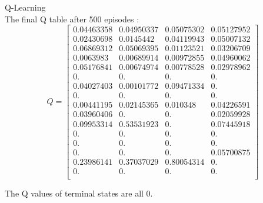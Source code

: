 \documentclass[12pt]{article}
\newenvironment{problem}[2][\large Problem]{\begin{trivlist}
\item[\hskip \labelsep {\bfseries #1}\hskip \labelsep {\bfseries #2.}]}{\end{trivlist}}
\begin{document}
\newpage
\begin{problem} {6} Q-Learning\\

The final Q table after 500 episodes :
$$ Q = \begin{bmatrix} 
 0.04463358 &  0.04950337 & 0.05075302 & 0.05127952\\
 0.02430698 & 0.0145442   & 0.04119943 & 0.05007132\\
 0.06869312 & 0.05069395  & 0.01123521 & 0.03206709\\
 0.0063983  & 0.00689914  & 0.00972855 & 0.04960062\\
 0.05176841 & 0.00674974  & 0.00778528 & 0.02978962\\
 0.         & 0.          & 0.         & 0.        \\
 0.04027403 & 0.00101772  & 0.09471334 & 0.        \\
 0.         & 0.          & 0.         & 0.        \\
 0.00441195 & 0.02145365  & 0.010348   & 0.04226591\\
 0.03960406 & 0.          & 0.         & 0.02059928\\
 0.09953314 & 0.53531923  & 0.         & 0.07445918\\
 0.         & 0.          & 0.         & 0.        \\
 0.         & 0.          & 0.         & 0.        \\
 0.         & 0.          & 0.         & 0.05700875\\
 0.23986141 & 0.37037029  & 0.80054314 & 0.        \\
 0.         & 0.          & 0.         & 0.        \\
\end{bmatrix} $$ 

The Q values of terminal states are all 0. 
\end{problem}
\end{document}
